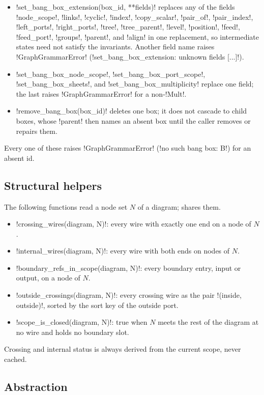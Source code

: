 \begin{itemize}
\item \py!set_bang_box_extension(box_id, **fields)! replaces any of the fields \py!node_scope!, \py!links!, \py!cyclic!, \py!index!, \py!copy_scalar!, \py!pair_of!, \py!pair_index!, \py!left_ports!, \py!right_ports!, \py!tree!, \py!tree_parent!, \py!level!, \py!position!, \py!feed!, \py!feed_port!, \py!groups!, \py!parent!, and \py!align! in one replacement, so intermediate states need not satisfy the invariants. Another field name raises \py!GraphGrammarError! (\code!set_bang_box_extension: unknown fields [...]!).
\item \py!set_bang_box_node_scope!, \py!set_bang_box_port_scope!, \py!set_bang_box_sheets!, and \py!set_bang_box_multiplicity! replace one field; the last raises \py!GraphGrammarError! for a non-\py!Mult!.
\item \py!remove_bang_box(box_id)! deletes one box; it does not cascade to child boxes, whose \py!parent! then names an absent box until the caller removes or repairs them.
\end{itemize}
Every one of these raises \py!GraphGrammarError! (\code!no such bang box: B!) for an absent id.

\subsection{Structural helpers}

The following functions read a node set $N$ of a diagram;  shares them.
\begin{itemize}
\item \py!crossing_wires(diagram, N)!: every wire with exactly one end on a node of $N$.
\item \py!internal_wires(diagram, N)!: every wire with both ends on nodes of $N$.
\item \py!boundary_refs_in_scope(diagram, N)!: every boundary entry, input or output, on a node of $N$.
\item \py!outside_crossings(diagram, N)!: every crossing wire as the pair \py!(inside, outside)!, sorted by the sort key of the outside port.
\item \py!scope_is_closed(diagram, N)!: true when $N$ meets the rest of the diagram at no wire and holds no boundary slot.
\end{itemize}
Crossing and internal status is always derived from the current scope, never cached.

\subsection{Abstraction}

